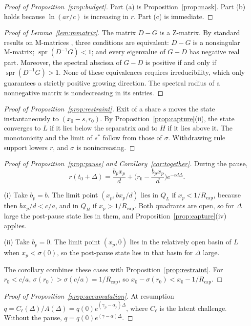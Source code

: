 \documentclass[11pt]{article}
\theoremstyle{plain}
\theoremstyle{definition}
\newcommand{\Rcap}{R_{\mathrm{cap}}}
\newcommand{\spr}{\operatorname{spr}}
\begin{document}
\begin{proof}[Proof of Proposition~\ref{prop:budget}]
Part (a) is Proposition~\ref{prop:mask}. Part (b) holds because $\ln(ar/c)$ is increasing in $r$. Part (c) is immediate.
\end{proof}

\begin{proof}[Proof of Lemma~\ref{lem:mmatrix}]
The matrix $D-G$ is a Z-matrix. By standard results on M-matrices \citep{berman1994,vandendriessche2002}, three conditions are equivalent: $D-G$ is a nonsingular M-matrix; $\spr(D^{-1}G)<1$; and every eigenvalue of $G-D$ has negative real part. Moreover, the spectral abscissa of $G-D$ is positive if and only if $\spr(D^{-1}G)>1$. None of these equivalences requires irreducibility, which only guarantees a strictly positive growing direction. The spectral radius of a nonnegative matrix is nondecreasing in its entries.
\end{proof}

\begin{proof}[Proof of Proposition~\ref{prop:restraint}]
Exit of a share $s$ moves the state instantaneously to $(x_0-s,r_0)$. By Proposition~\ref{prop:capture}(ii), the state converges to $L$ if it lies below the separatrix and to $H$ if it lies above it. The monotonicity and the limit of $s^\ast$ follow from those of $\sigma$. Withdrawing rule support lowers $r$, and $\sigma$ is nonincreasing.
\end{proof}

\begin{proof}[Proof of Proposition~\ref{prop:pause} and Corollary~\ref{cor:together}]
During the pause,
\[
r(t_0+\Delta)=\frac{b_px_p}{d}+\Big(r_0-\frac{b_px_p}{d}\Big)e^{-\varepsilon d\Delta}.
\]

(i) Take $b_p=b$. The limit point $(x_p,bx_p/d)$ lies in $Q_L$ if $x_p<1/\Rcap$, because then $bx_p/d<c/a$, and in $Q_H$ if $x_p>1/\Rcap$. Both quadrants are open, so for $\Delta$ large the post-pause state lies in them, and Proposition~\ref{prop:capture}(iv) applies.

(ii) Take $b_p=0$. The limit point $(x_p,0)$ lies in the relatively open basin of $L$ when $x_p<\sigma(0)$, so the post-pause state lies in that basin for $\Delta$ large.

The corollary combines these cases with Proposition~\ref{prop:restraint}. For $r_0<c/a$, $\sigma(r_0)>\sigma(c/a)=1/\Rcap$, so $x_0-\sigma(r_0)<x_0-1/\Rcap$.
\end{proof}

\begin{proof}[Proof of Proposition~\ref{prop:accumulation}]
At resumption $q=C_\ell(\Delta)/A(\Delta)=q(0)e^{(\gamma_p-\alpha_p)\Delta}$, where $C_\ell$ is the latent challenge. Without the pause, $q=q(0)e^{(\gamma-\alpha)\Delta}$.
\end{proof}
\end{document}
